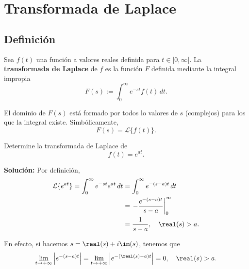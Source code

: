 \chapter{Transformada de Laplace}

\section{Definición}

\begin{defi}
Sea $f(t)$ una función a valores reales definida para $t \in [0, \infty[$. La \textbf{transformada de Laplace} de $f$ es la función $F$ definida mediante la integral impropia
$$F(s) := \int_0^{\infty} e^{-st} f(t) \,dt.$$

El dominio de $F(s)$ está formado por todos lo valores de $s$ (complejos) para los que la integral existe. Simbólicamente,
$$F(s) = \mathcal{L}\{f(t)\}.$$
\end{defi}

\begin{ejemplo}
Determine la transformada de Laplace de 
$$f(t) = e^{at}.$$

\textbf{Solución:} Por definición, 
\begin{align*}
    \mathcal{L}\{e^{at}\} = \int_0^{\infty} e^{-st} e^{at} \,dt &= \int_0^{\infty} e^{-(s-a)t} \,dt \\
    &= \left. - \frac{e^{-(s-a)t}}{s-a} \right|_0^{\infty} \\
    &= \frac{1}{s-a}, \quad \real(s) > a.
\end{align*}

En efecto, si hacemos $s = \real(s) + i \im(s)$, tenemos que
$$\lim_{t\to + \infty} \left| e^{-(s-a)t} \right| = \lim_{t\to + \infty} \left|e^{-(\real(s) - a)t} \right| = 0, \quad \real(s) > a. $$
\end{ejemplo}

